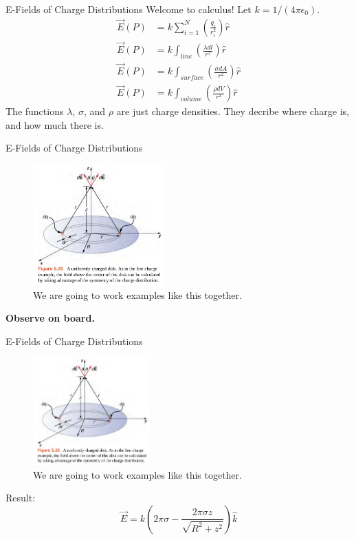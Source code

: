 \documentclass{beamer}
\begin{document}
\begin{frame}{E-Fields of Charge Distributions}
Welcome to calculus! Let $k = 1/(4\pi\epsilon_0)$.
\begin{align}
\vec{E}(P) &= k \sum_{i = 1}^N \left(\frac{q_i}{r_i^2}\right) \hat{r} \label{eq:point} \\
\vec{E}(P) &= k \int_{line} \left(\frac{\lambda dl}{r^2}\right) \hat{r} \label{eq:line} \\
\vec{E}(P) &= k \int_{surface} \left(\frac{\sigma dA}{r^2}\right) \hat{r} \label{eq:surface} \\
\vec{E}(P) &= k \int_{volume} \left(\frac{\rho dV}{r^2}\right) \hat{r} \label{eq:volume}
\end{align}
The functions $\lambda$, $\sigma$, and $\rho$ are just charge densities.  They decribe where charge is, and how much there is.  
\end{frame}

\begin{frame}{E-Fields of Charge Distributions}
\begin{figure}
\includegraphics[width=0.45\textwidth]{figures/disk.png}
\caption{\label{fig:disk} We are going to work examples like this together.}
\end{figure}
\textbf{Observe on board.}
\end{frame}

\begin{frame}{E-Fields of Charge Distributions}
\begin{figure}
\includegraphics[width=0.4\textwidth]{figures/disk.png}
\caption{\label{fig:disk2} We are going to work examples like this together.}
\end{figure}
Result:
\begin{equation}
\boxed{
\vec{E} = k\left(2\pi\sigma - \frac{2\pi\sigma z}{\sqrt{R^2 + z^2}} \right)\hat{k}}
\end{equation}
\end{frame}
\end{document}
